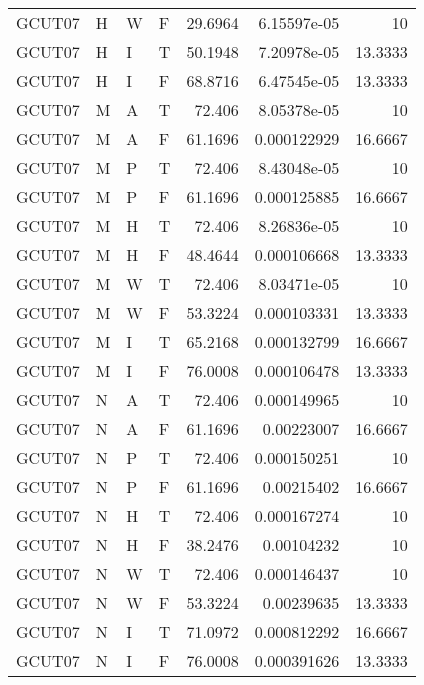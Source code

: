 \begin{table}[!htb]
{\begin{tabular}{llllrrr}
            GCUT07   & H     & W     & F          & 29.6964    & 6.15597e-05 & 10       \\
            GCUT07   & H     & I     & T          & 50.1948    & 7.20978e-05 & 13.3333  \\
            GCUT07   & H     & I     & F          & 68.8716    & 6.47545e-05 & 13.3333  \\
            GCUT07   & M     & A     & T          & 72.406     & 8.05378e-05 & 10       \\
            GCUT07   & M     & A     & F          & 61.1696    & 0.000122929 & 16.6667  \\
            GCUT07   & M     & P     & T          & 72.406     & 8.43048e-05 & 10       \\
            GCUT07   & M     & P     & F          & 61.1696    & 0.000125885 & 16.6667  \\
            GCUT07   & M     & H     & T          & 72.406     & 8.26836e-05 & 10       \\
            GCUT07   & M     & H     & F          & 48.4644    & 0.000106668 & 13.3333  \\
            GCUT07   & M     & W     & T          & 72.406     & 8.03471e-05 & 10       \\
            GCUT07   & M     & W     & F          & 53.3224    & 0.000103331 & 13.3333  \\
            GCUT07   & M     & I     & T          & 65.2168    & 0.000132799 & 16.6667  \\
            GCUT07   & M     & I     & F          & 76.0008    & 0.000106478 & 13.3333  \\
            GCUT07   & N     & A     & T          & 72.406     & 0.000149965 & 10       \\
            GCUT07   & N     & A     & F          & 61.1696    & 0.00223007  & 16.6667  \\
            GCUT07   & N     & P     & T          & 72.406     & 0.000150251 & 10       \\
            GCUT07   & N     & P     & F          & 61.1696    & 0.00215402  & 16.6667  \\
            GCUT07   & N     & H     & T          & 72.406     & 0.000167274 & 10       \\
            GCUT07   & N     & H     & F          & 38.2476    & 0.00104232  & 10       \\
            GCUT07   & N     & W     & T          & 72.406     & 0.000146437 & 10       \\
            GCUT07   & N     & W     & F          & 53.3224    & 0.00239635  & 13.3333  \\
            GCUT07   & N     & I     & T          & 71.0972    & 0.000812292 & 16.6667  \\
            GCUT07   & N     & I     & F          & 76.0008    & 0.000391626 & 13.3333  \\
            \hline
        \end{tabular}
    }{}
\end{table}